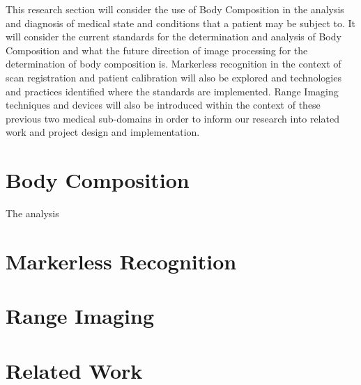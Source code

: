 This research section will consider the use of Body Composition in the analysis and diagnosis of medical state and conditions that a patient may be subject to. 
It will consider the current standards for the determination and analysis of Body Composition and what the future direction of image processing for the determination of body composition is.
Markerless recognition in the context of scan registration and patient calibration will also be explored and technologies and practices identified where the standards are implemented. 
Range Imaging techniques and devices will also be introduced within the context of these previous two medical sub-domains in order to inform our research into related work and project design and implementation.

\section{Body Composition}

The analysis

\section{Markerless Recognition}

\section{Range Imaging}

\section{Related Work}

